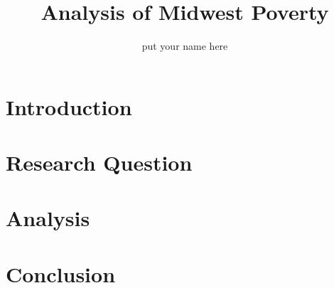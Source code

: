 \documentclass[12pt,a4paper]{article}
\author{put your name here}
\title{Analysis of Midwest Poverty}
\begin{document}
	\maketitle
\section*{Introduction}

\section*{Research Question}

\section*{Analysis}

\section*{Conclusion}
\end{document}
